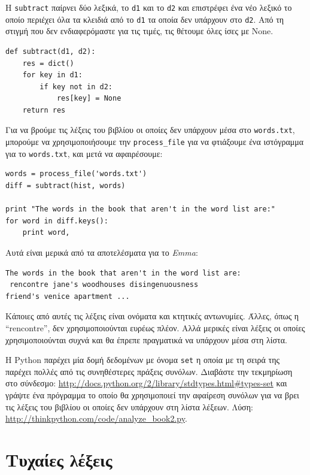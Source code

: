 \documentclass[10pt]{book}
\begin{document}
Η {\tt subtract} παίρνει δύο λεξικά, το {\tt d1} και το {\tt d2} και επιστρέφει ένα νέο λεξικό 
το οποίο περιέχει όλα τα κλειδιά από το {\tt d1} τα οποία δεν υπάρχουν στο {\tt d2}. Από τη στιγμή που δεν ενδιαφερόμαστε για τις τιμές, τις θέτουμε όλες ίσες με  None.

\begin{verbatim}
def subtract(d1, d2):
    res = dict()
    for key in d1:
        if key not in d2:
            res[key] = None
    return res
\end{verbatim}
%
Για να βρούμε τις λέξεις του βιβλίου οι οποίες δεν υπάρχουν μέσα στο {\tt words.txt}, μπορούμε να χρησιμοποιήσουμε την \verb"process_file" για να φτιάξουμε ένα ιστόγραμμα για το {\tt words.txt}, και μετά να αφαιρέσουμε:

\begin{verbatim}
words = process_file('words.txt')
diff = subtract(hist, words)

print "The words in the book that aren't in the word list are:"
for word in diff.keys():
    print word,
\end{verbatim}
%
Αυτά είναι μερικά από τα αποτελέσματα για το {\em Emma}: 

\begin{verbatim}
The words in the book that aren't in the word list are:
 rencontre jane's woodhouses disingenuousness
friend's venice apartment ...
\end{verbatim}
%
Κάποιες από αυτές τις λέξεις είναι ονόματα και κτητικές αντωνυμίες. Άλλες, όπως η ``rencontre'', δεν χρησιμοποιούνται ευρέως πλέον. Αλλά μερικές είναι λέξεις οι οποίες χρησιμοποιούνται συχνά και θα έπρεπε πραγματικά να υπάρχουν μέσα στη λίστα.
\\
\begin{exercise}

Η Python παρέχει μία δομή δεδομένων με όνομα {\tt set} η οποία με τη σειρά της παρέχει πολλές από τις συνηθέστερες πράξεις συνόλων. Διαβάστε την τεκμηρίωση στο σύνδεσμο: \url{http://docs.python.org/2/library/stdtypes.html#types-set} και γράψτε ένα πρόγραμμα το οποίο θα χρησιμοποιεί την αφαίρεση συνόλων για να βρει τις λέξεις του βιβλίου οι οποίες δεν υπάρχουν στη λίστα λέξεων. Λύση: \url{http://thinkpython.com/code/analyze_book2.py}.
\end{exercise}

 
\section{Τυχαίες λέξεις}
\label{randomwords}
\end{document}
